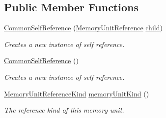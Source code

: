 \subsection*{Public Member Functions}
\begin{DoxyCompactItemize}
\item 
\hyperlink{classedu_1_1udel_1_1cis_1_1vsl_1_1civl_1_1model_1_1common_1_1expression_1_1reference_1_1CommonSelfReference_a32159052f637ca8f27916d673b68ca59}{Common\+Self\+Reference} (\hyperlink{interfaceedu_1_1udel_1_1cis_1_1vsl_1_1civl_1_1model_1_1IF_1_1expression_1_1reference_1_1MemoryUnitReference}{Memory\+Unit\+Reference} \hyperlink{classedu_1_1udel_1_1cis_1_1vsl_1_1civl_1_1model_1_1common_1_1expression_1_1reference_1_1CommonReference_a32b580fa84654a7581644054dd9a7fa7}{child})
\begin{DoxyCompactList}\small\item\em Creates a new instance of self reference. \end{DoxyCompactList}\item 
\hyperlink{classedu_1_1udel_1_1cis_1_1vsl_1_1civl_1_1model_1_1common_1_1expression_1_1reference_1_1CommonSelfReference_af0d5ce838e5bf353554ca900dc0abb11}{Common\+Self\+Reference} ()
\begin{DoxyCompactList}\small\item\em Creates a new instance of self reference. \end{DoxyCompactList}\item 
\hyperlink{enumedu_1_1udel_1_1cis_1_1vsl_1_1civl_1_1model_1_1IF_1_1expression_1_1reference_1_1MemoryUnitRef64a306b012808a0db442488810ff9534}{Memory\+Unit\+Reference\+Kind} \hyperlink{classedu_1_1udel_1_1cis_1_1vsl_1_1civl_1_1model_1_1common_1_1expression_1_1reference_1_1CommonSelfReference_a1c2a347b7fe7de1b21a604123005931c}{memory\+Unit\+Kind} ()
\begin{DoxyCompactList}\small\item\em The reference kind of this memory unit. \end{DoxyCompactList}\end{DoxyCompactItemize}
